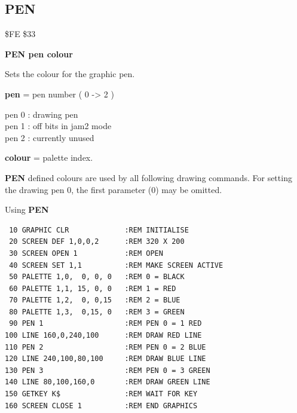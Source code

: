 \subsection{PEN}
\begin{description}[leftmargin=2cm,style=nextline]
\item [Token:] \$FE \$33
\item [Format:] {\bf PEN pen colour}
\item [Usage:]  Sets the colour for the graphic pen.

                {\bf pen} = pen number ( 0 -> 2 )

                pen 0 : drawing pen \\
                pen 1 : off bits in jam2 mode \\
                pen 2 : currently unused

                {\bf colour} = palette index.

\item [Remarks:] {\bf PEN} defined colours are used by all
                 following drawing commands.
                 For setting the drawing pen 0, the first
                 parameter (0) may be omitted.

\item [Example:] Using {\bf PEN}

\begin{tcolorbox}[colback=black,coltext=white]
\verbatimfont{\codefont}
\begin{verbatim}
 10 GRAPHIC CLR             :REM INITIALISE
 20 SCREEN DEF 1,0,0,2      :REM 320 X 200
 30 SCREEN OPEN 1           :REM OPEN
 40 SCREEN SET 1,1          :REM MAKE SCREEN ACTIVE
 50 PALETTE 1,0,  0, 0, 0   :REM 0 = BLACK
 60 PALETTE 1,1, 15, 0, 0   :REM 1 = RED
 70 PALETTE 1,2,  0, 0,15   :REM 2 = BLUE
 80 PALETTE 1,3,  0,15, 0   :REM 3 = GREEN
 90 PEN 1                   :REM PEN 0 = 1 RED
100 LINE 160,0,240,100      :REM DRAW RED LINE
110 PEN 2                   :REM PEN 0 = 2 BLUE
120 LINE 240,100,80,100     :REM DRAW BLUE LINE
130 PEN 3                   :REM PEN 0 = 3 GREEN
140 LINE 80,100,160,0       :REM DRAW GREEN LINE
150 GETKEY K$               :REM WAIT FOR KEY
160 SCREEN CLOSE 1          :REM END GRAPHICS
\end{verbatim}
\end{tcolorbox}
\end{description}




